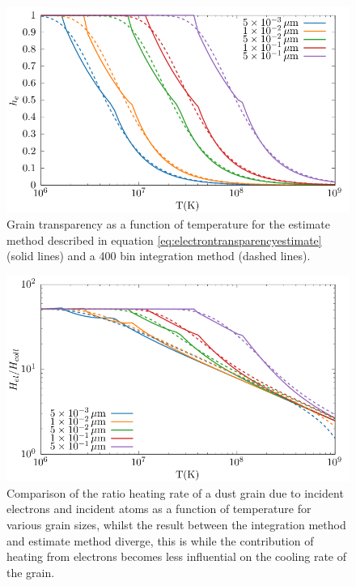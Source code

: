 \begin{figure}
  \centering
  \includegraphics{assets/grain-transparency/grain-trans.pdf}
  \caption[Electron transparency method accuracy - $h_e$]{Grain transparency as a function of temperature for the estimate method described in equation \ref{eq:electrontransparencyestimate} (solid lines) and a 400 bin integration method (dashed lines).}
  \label{fig:graintransacc}
\end{figure}

\begin{figure}
  \centering
  \includegraphics{assets/grain-transparency/contrib-comp.pdf}
  \caption[Electron transparency method accuracy - $H_{el}/H_{coll}$]{Comparison of the ratio heating rate of a dust grain due to incident electrons and incident atoms as a function of temperature for various grain sizes, whilst the result between the integration method and estimate method diverge, this is while the contribution of heating from electrons becomes less influential on the cooling rate of the grain.}
  \label{fig:contribution-int-vs-est}
\end{figure}

